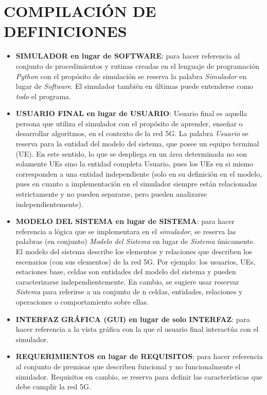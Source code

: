 \section{COMPILACIÓN DE DEFINICIONES}
\begin{itemize}
    \item \textbf{SIMULADOR en lugar de SOFTWARE}: para hacer referencia al conjunto de procedimientos y rutinas creadas en el lenguaje de programación \textit{Python} con el propósito de simulación se reserva la palabra \textit{Simulador} en lugar de \textit{Software}. El simulador también en últimas puede entenderse como \textit{todo} el programa.
    \item \textbf{USUARIO FINAL en lugar de USUARIO}: Usuario final es aquella persona que utiliza el simulador con el propósito de aprender, enseñar o desarrollar algoritmos, en el contexto de la red 5G. La palabra \textit{Usuario} se reserva para la entidad del modelo del sistema, que posee un equipo terminal (UE). En este sentido, lo que se despliega en un área determinada no son solamente UEs sino la entidad completa Usuario, pues los UEs en si mismo corresponden a una entidad independiente (solo en su definición en el modelo, pues en cuanto a implementación en el simulador siempre están relacionadas estrictamente y no pueden separarse, pero pueden analizarse independientemente).
    
    \item \textbf{MODELO DEL SISTEMA en lugar de SISTEMA}: para hacer referencia a lógica que se implementara en el \textit{simulador}, se reserva las palabras (en conjunto) \textit{Modelo del Sistema} en lugar de \textit{Sistema} únicamente. El modelo del sistema describe los elementos y relaciones que describen los escenarios (con sus elementos) de la red 5G. Por ejemplo: los usuarios, UEs, estaciones base, celdas son entidades del modelo del sistema y pueden caracterizarse independientemente. En cambio, se sugiere usar reservar \textit{Sistema} para referirse a un conjunto de n celdas, entidades, relaciones y operaciones o comportamiento sobre ellas. %

    \item \textbf{INTERFAZ GRÁFICA (GUI) en lugar de solo INTERFAZ}: para hacer referencia a la vista gráfica con la que el usuario final interactúa con el simulador.
     \item \textbf{REQUERIMIENTOS en lugar de REQUISITOS}: para hacer referencia al conjunto de premisas que describen funcional y no funcionalmente el simulador. Requisitos en cambio, se reserva para definir las características que debe cumplir la red 5G.
     

\end{itemize}
